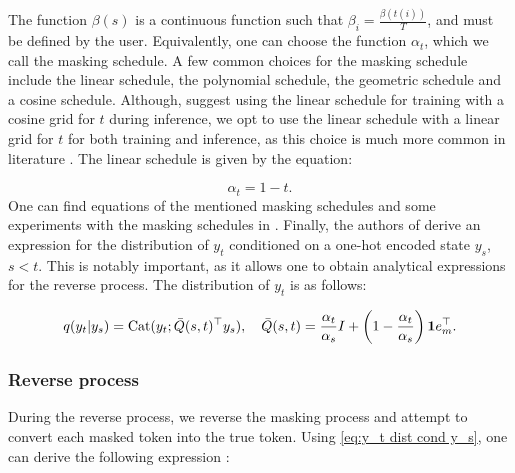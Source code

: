 The function $\beta(s)$ is a continuous function such that $\beta_i = \frac{\beta(t(i))}{T}$, and must be defined by the user. Equivalently, one can choose the function $\alpha_t$, which we call the masking schedule. A few common choices for the masking schedule include the linear schedule, the polynomial schedule, the geometric schedule and a cosine schedule. Although, \citeauthor{shi2025simplifiedgeneralizedmaskeddiffusion} \cite{shi2025simplifiedgeneralizedmaskeddiffusion} suggest using the linear schedule for training with a cosine grid for $t$ during inference, we opt to use the linear schedule with a linear grid for $t$ for both training and inference, as this choice is much more common in literature \cite{shi2025simplifiedgeneralizedmaskeddiffusion,nie2025scalingmaskeddiffusionmodels}. The linear schedule is given by the equation:

\begin{equation*}
    \alpha_t = 1 - t.
\end{equation*}
One can find equations of the mentioned masking schedules and some experiments with the masking schedules in \cite{shi2025simplifiedgeneralizedmaskeddiffusion}. Finally, the authors of \cite{shi2025simplifiedgeneralizedmaskeddiffusion} derive an expression for the distribution of $y_t$ conditioned on a one-hot encoded state $y_s$, $s < t$. This is notably important, as it allows one to obtain analytical expressions for the reverse process. The distribution of $y_t$ is as follows:

\begin{equation}
    q(y_t | y_s) = \text{Cat}(y_t; \bar{Q}(s, t)^\top y_s), \quad\bar{Q}(s, t) = \frac{\alpha_t}{\alpha_s}I + \left(1 - \frac{\alpha_t}{\alpha_s}\right)\bold{1}e_m^\top.  %
    \label{eq:y_t dist cond y_s}
\end{equation}



\subsubsection{Reverse process}

During the reverse process, we reverse the masking process and attempt to convert each masked token into the true token. Using \eqref{eq:y_t dist cond y_s}, one can derive the following expression \cite{shi2025simplifiedgeneralizedmaskeddiffusion}:

